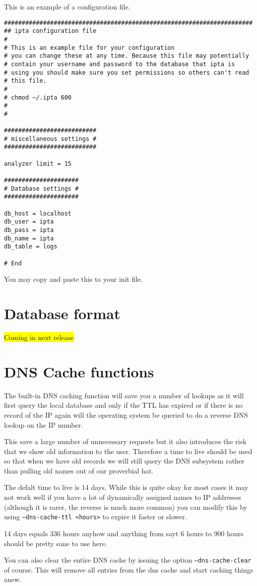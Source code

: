\documentclass[english,twoside,openright,a4paper,12pt]{article}
\newcommand{\hilight}[1]{\colorbox{yellow}{#1}}
\begin{document}
This is an example of a configuration file.

\begin{verbatim}
######################################################################
## ipta configuration file
#
# This is an example file for your configuration
# you can change these at any time. Because this file may potentially
# contain your username and password to the database that ipta is 
# using you should make sure you set permissions so others can't read
# this file.
#
# chmod ~/.ipta 600
#
#

##########################
# miscellaneous settings #
##########################

analyzer limit = 15

#####################
# Database settings #
#####################

db_host = localhost
db_user = ipta
db_pass = ipta
db_name = ipta
db_table = logs

# End
\end{verbatim}

You may copy and paste this to your init file.

\section{Database format}

\hilight{Coming in next release}

\section{DNS Cache functions}

The built-in DNS caching function will save you a number of lookups as it will first query the local database and only if the TTL has expired or if there is no record of the IP again will the operating system be queried to do a reverse DNS lookup on the IP number.

This save a large number of unnecessary requests but it also introduces the risk that we show old information to the user. Therefore a time to live should be used so that when we have old records we will still query the DNS subsystem rather than pulling old names out of our proverbial hat.

The defalt time to live is 14 days. While this is quite okay for most cases it may not work well if you have a lot of dynamically assigned names to IP addresses (although it is rarer, the reverse is much more common) you can modify this by using \texttt{--dns-cache-ttl <hours>} to expire it faster or slower.

14 days equals 336 hours anyhow and anything from sayt 6 hours to 900 hours should be pretty sane to use here.

You can also clear the entire DNS cache by issuing the option \texttt{--dns-cache-clear} of course. This will remove all entries from the dns cache and start caching things anew.
\end{document}
